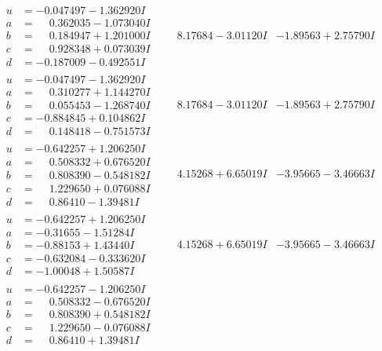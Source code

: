 \documentclass[1p]{elsarticle_modified}
\theoremstyle{definition}
\begin{document}
$$\begin{array}{c|c|c}
 \hline 
\begin{aligned}
u &= -0.047497 - 1.362920 I \\
a &= \phantom{-}0.362035 - 1.073040 I \\
b &= \phantom{-}0.184947 + 1.201000 I \\
c &= \phantom{-}0.928348 + 0.073039 I \\
d &= -0.187009 - 0.492551 I\end{aligned}
 & \phantom{-}8.17684 - 3.01120 I & -1.89563 + 2.75790 I \\ \hline\begin{aligned}
u &= -0.047497 - 1.362920 I \\
a &= \phantom{-}0.310277 + 1.144270 I \\
b &= \phantom{-}0.055453 - 1.268740 I \\
c &= -0.884845 + 0.104862 I \\
d &= \phantom{-}0.148418 - 0.751573 I\end{aligned}
 & \phantom{-}8.17684 - 3.01120 I & -1.89563 + 2.75790 I \\ \hline\begin{aligned}
u &= -0.642257 + 1.206250 I \\
a &= \phantom{-}0.508332 + 0.676520 I \\
b &= \phantom{-}0.808390 - 0.548182 I \\
c &= \phantom{-}1.229650 + 0.076088 I \\
d &= \phantom{-}0.86410 - 1.39481 I\end{aligned}
 & \phantom{-}4.15268 + 6.65019 I & -3.95665 - 3.46663 I \\ \hline\begin{aligned}
u &= -0.642257 + 1.206250 I \\
a &= -0.31655 - 1.51284 I \\
b &= -0.88153 + 1.43440 I \\
c &= -0.632084 - 0.333620 I \\
d &= -1.00048 + 1.50587 I\end{aligned}
 & \phantom{-}4.15268 + 6.65019 I & -3.95665 - 3.46663 I \\ \hline\begin{aligned}
u &= -0.642257 - 1.206250 I \\
a &= \phantom{-}0.508332 - 0.676520 I \\
b &= \phantom{-}0.808390 + 0.548182 I \\
c &= \phantom{-}1.229650 - 0.076088 I \\
d &= \phantom{-}0.86410 + 1.39481 I\end{aligned}

\end{array}$$
\end{document}
